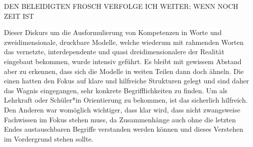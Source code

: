 



DEN BELEIDIGTEN FROSCH VERFOLGE ICH WEITER; WENN NOCH ZEIT IST




Dieser Diskurs um die Ausformulierung von Kompetenzen in Worte und zweidimensionale, druckbare Modelle, welche wiederum mit rahmenden Worten das vernetzte, interdependente und quasi dreidimensionalere der Realität eingebaut bekommen, wurde intensiv geführt. Es bleibt mit gewissem Abstand aber zu erkennen, dass sich die Modelle in weiten Teilen dann doch ähneln. 
Die einen \autocite{weißeno.2010} hatten den Fokus auf klare und hilfreiche Strukturen gelegt und sind daher das Wagnis eingegangen, sehr konkrete Begrifflichkeiten zu finden. Um als Lehrkraft oder Schüler*in Orientierung zu bekommen, ist das sicherlich hilfreich. Den Anderen \autocite{Besand.2011} war womöglich wichtiger, dass klar wird, dass nicht zwangsweise Fachwissen im Fokus stehen muss, da Zusammenhänge auch ohne die letzten Endes austauschbaren Begriffe verstanden werden können und dieses Verstehen im Vordergrund stehen sollte. 

